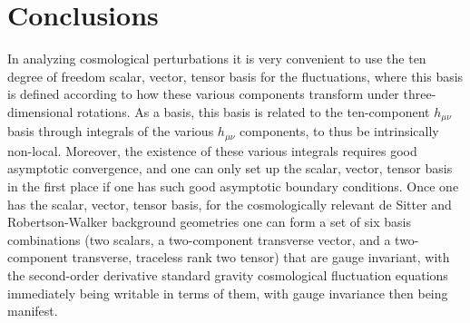 \documentclass[aps,onecolumn,10pt]{revtex4}
\numberwithin{equation}{section}
\numberwithin{equation}{section}
\begin{document}
\section{Conclusions}
\label{S15}

In analyzing cosmological perturbations it is very convenient to use the ten degree of freedom scalar, vector, tensor basis for the fluctuations, where this basis is defined according to how these various components transform under three-dimensional rotations. As a basis, this basis is related to the ten-component $h_{\mu\nu}$ basis through integrals of the various $h_{\mu\nu}$ components, to thus be intrinsically non-local. Moreover, the existence of these various integrals requires good asymptotic convergence, and one can only set up the scalar, vector, tensor basis in the first place if one has such good asymptotic boundary conditions. Once one has the scalar, vector, tensor basis, for the cosmologically relevant de Sitter and Robertson-Walker background geometries one can form a set of six basis combinations (two scalars, a two-component transverse vector, and a two-component transverse, traceless rank two tensor) that are gauge invariant,  with the second-order derivative standard gravity cosmological fluctuation equations immediately being writable in terms of them, with gauge invariance then being manifest.
\end{document}

